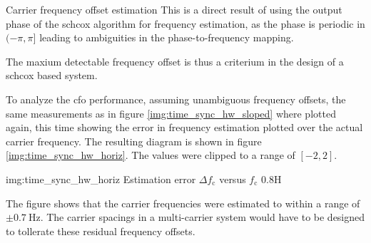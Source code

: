 \begin{subchapter}{Carrier frequency offset estimation}
  This is a direct result of using the output phase
  of the \gls{schcox} algorithm for frequency estimation,
  as the phase is periodic in $(-\pi, \pi]$ leading to
  ambiguities in the phase-to-frequency mapping.

  The maxium detectable frequency offset is thus
  a criterium in the design of a \gls{schcox}
  based system.

  To analyze the \gls{cfo} performance, assuming unambiguous
  frequency offsets, the same measurements
  as in figure \ref{img:time_sync_hw_sloped} where plotted
  again, this time showing the error in frequency estimation
  plotted over the actual carrier frequency.
  The resulting diagram is shown in
  figure \ref{img:time_sync_hw_horiz}.
  The values were clipped to a range of $[-2, 2]$.

                  {img:time_sync_hw_horiz}
                  {Estimation error $\Delta f_\text{c}$ versus $f_\text{c}$}
                  {0.8}{H}

  The figure shows that the carrier frequencies were
  estimated to within a range of $\pm\SI{0.7}{\hertz}$.
  The carrier spacings in a multi-carrier system
  would have to be designed to tollerate these residual
  frequency offsets.
\end{subchapter}

